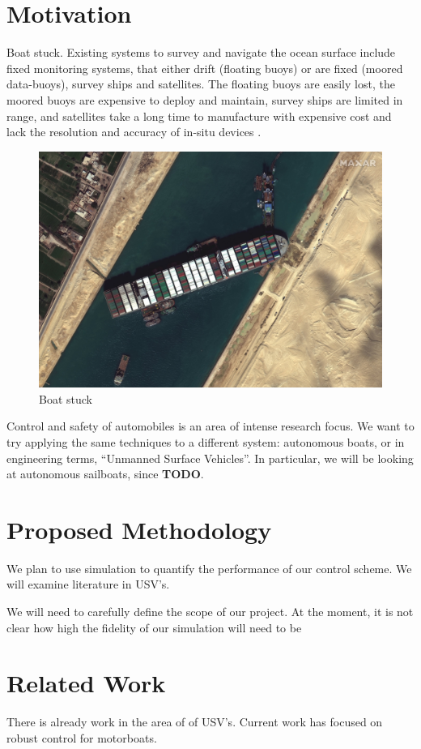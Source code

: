 \documentclass[conference]{IEEEtran}
\begin{document}
\section{Motivation}
Boat stuck. Existing systems to survey and navigate the ocean surface include fixed monitoring systems, that either drift (floating buoys) or are fixed (moored data-buoys), survey ships and satellites. The floating buoys are easily lost, the moored buoys are expensive to deploy and maintain, survey ships are limited in range, and satellites take a long time to manufacture with expensive cost and lack the resolution and accuracy of in-situ devices \cite{Sauzé2006}.
\begin{figure}
    \centering
    \includegraphics{documents/proposal/Suez_Canal_blocked_by_Ever_Given_March_27_2021.jpg}
    \caption{Boat stuck\label{fig:boat_stuck}}
\end{figure}
Control and safety of automobiles is an area of intense research focus. We want to try applying the same techniques to a different system: autonomous boats, or in engineering terms, \enquote{Unmanned Surface Vehicles}. In particular, we will be looking at autonomous sailboats, since \textbf{TODO}.
\section{Proposed Methodology}
We plan to use simulation to quantify the performance of our control scheme. We will examine literature in USV's.

We will need to carefully define the scope of our project. At the moment, it is not clear how high the fidelity of our simulation will need to be 
\section{Related Work}
There is already work in the area of of USV's. Current work has focused on robust control for motorboats.
\end{document}
